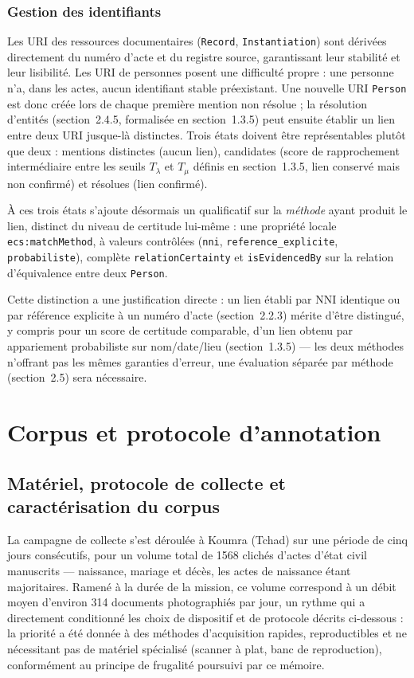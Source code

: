 \subsubsection*{Gestion des identifiants}

Les URI des ressources documentaires (\texttt{Record}, \texttt{Instantiation}) sont dérivées directement du numéro d'acte et du registre source, garantissant leur stabilité et leur lisibilité.
Les URI de personnes posent une difficulté propre : une personne n'a, dans les actes, aucun identifiant stable préexistant.
Une nouvelle URI \texttt{Person} est donc créée lors de chaque première mention non résolue ; la résolution d'entités (section~2.4.5, formalisée en section~1.3.5) peut ensuite établir un lien entre deux URI jusque-là distinctes.
Trois états doivent être représentables plutôt que deux : mentions distinctes (aucun lien), candidates (score de rapprochement intermédiaire entre les seuils $T_\lambda$ et $T_\mu$ définis en section~1.3.5, lien conservé mais non confirmé) et résolues (lien confirmé).

À ces trois états s'ajoute désormais un qualificatif sur la \emph{méthode} ayant produit le lien, distinct du niveau de certitude lui-même : une propriété locale \texttt{ecs:\allowbreak matchMethod}, à valeurs contrôlées (\texttt{nni}, \texttt{reference\allowbreak \_explicite}, \texttt{probabiliste}), complète \texttt{relation\allowbreak Certainty} et \texttt{is\allowbreak Evidenced\allowbreak By} sur la relation d'équivalence entre deux \texttt{Person}.

Cette distinction a une justification directe : un lien établi par NNI identique ou par référence explicite à un numéro d'acte (section~2.2.3) mérite d'être distingué, y compris pour un score de certitude comparable, d'un lien obtenu par appariement probabiliste sur nom/date/lieu (section~1.3.5) --- les deux méthodes n'offrant pas les mêmes garanties d'erreur, une évaluation séparée par méthode (section~2.5) sera nécessaire.

\section{Corpus et protocole d'annotation}

\subsection{Matériel, protocole de collecte et caractérisation du corpus}
La campagne de collecte s'est déroulée à Koumra (Tchad) sur une période de cinq jours consécutifs, pour un volume total de 1568 clichés d'actes d'état civil manuscrits --- naissance, mariage et décès, les actes de naissance étant majoritaires.
Ramené à la durée de la mission, ce volume correspond à un débit moyen d'environ 314 documents photographiés par jour, un rythme qui a directement conditionné les choix de dispositif et de protocole décrits ci-dessous : la priorité a été donnée à des méthodes d'acquisition rapides, reproductibles et ne nécessitant pas de matériel spécialisé (scanner à plat, banc de reproduction), conformément au principe de frugalité poursuivi par ce mémoire.

